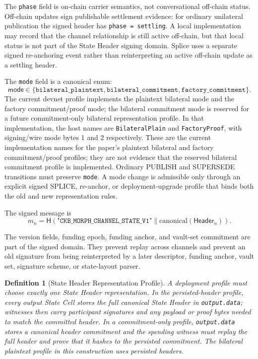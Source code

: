 \documentclass[a4paper,11pt]{article}
\newtheorem{definition}{Definition}
\newcommand{\Header}{\mathsf{Header}}
\newcommand{\hash}{\mathsf{H}}
\begin{document}
The \texttt{phase} field is on-chain carrier semantics, not conversational
off-chain status. Off-chain updates sign publishable settlement evidence:
for ordinary unilateral publication the signed header has
\texttt{phase = settling}. A local implementation may record that the channel
relationship is still active off-chain, but that local status is not part of
the State Header signing domain. Splice uses a separate signed re-anchoring
event rather than reinterpreting an active off-chain update as a settling
header.

The \texttt{mode} field is a canonical enum:
\[
\mathsf{mode}\in\{
\texttt{bilateral\_plaintext},
\texttt{bilateral\_commitment},
\texttt{factory\_commitment}
\}.
\]
The current devnet profile implements the plaintext bilateral mode and the
factory commitment/proof mode; the bilateral commitment mode is reserved for a
future commitment-only bilateral representation profile.
In that implementation, the host names are \texttt{BilateralPlain} and
\texttt{FactoryProof}, with signing/wire mode bytes 1 and 2 respectively. These
are the current implementation names for the paper's plaintext bilateral and
factory commitment/proof profiles; they are not evidence that the reserved
bilateral commitment profile is implemented.
Ordinary \textsf{PUBLISH} and \textsf{SUPERSEDE} transitions must preserve
\texttt{mode}. A mode change is admissible only through an explicit signed
\textsf{SPLICE}, re-anchor, or deployment-upgrade profile that binds both the
old and new representation rules.

The signed message is
\[
m_n =
\hash(\texttt{"CKB\_MORPH\_CHANNEL\_STATE\_V1"}
\parallel \mathrm{canonical}(\Header_n)).
\]

The version fields, funding epoch, funding anchor, and vault-set commitment are part of the signed domain. They prevent replay across channels and prevent an old signature from being reinterpreted by a later descriptor, funding anchor, vault set, signature scheme, or state-layout parser.

\begin{definition}[State Header Representation Profile]
A deployment profile must choose exactly one State Header representation. In
the persisted-header profile, every output State Cell stores the full canonical
State Header in \texttt{output.data}; witnesses then carry participant
signatures and any payload or proof bytes needed to match the committed header.
In a commitment-only profile, \texttt{output.data} stores a canonical header
commitment and the spending witness must replay the full header and prove that
it hashes to the persisted commitment. The bilateral plaintext profile in this
construction uses persisted headers.
\end{definition}
\end{document}
